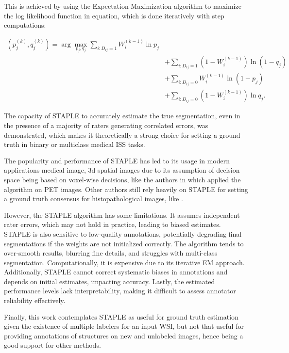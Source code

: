 This is achieved by using the Expectation-Maximization algorithm to
maximize the log likelihood function in equation, which is done iteratively
with step computations:

\begin{equation}
  \begin{split}
    (p_j^{(k)}, q_j^{(k)}) = \arg\max_{p_j, q_j} \sum_{i:D_{ij}=1}
    W_i^{(k-1)} \ln p_j \\
    &+ \sum_{i:D_{ij}=1} \left(1 - W_i^{(k-1)}\right) \ln (1 - q_j) \\
    &+ \sum_{i:D_{ij}=0} W_i^{(k-1)} \ln (1 - p_j) \\
    &+ \sum_{i:D_{ij}=0} \left(1 - W_i^{(k-1)}\right) \ln q_j.
  \end{split}
\end{equation}

The capacity of STAPLE to accurately estimate the true segmentation,
even in the presence of a majority of raters generating correlated
errors, was demonstrated, which makes it theoretically a strong
choice for setting a ground-truth in binary or multiclass medical
\gls{ISS} tasks.

The popularity and performance of \gls{STAPLE} has led to its
usage in modern applications medical image, 3d spatial images due to
its assumption of decision space being based on voxel-wise decisions,
like the authors in \cite{GrefveEtAl2024} which applied the algorithm
on \gls{PET} images. Other authors still rely heavily on STAPLE for
setting a ground truth consensus for histopathological images, like
\cite{QiuEtAl2022}.

However, the \gls{STAPLE} algorithm has some limitations. It
assumes independent rater errors, which may not hold in practice,
leading to biased estimates. STAPLE is also sensitive to low-quality
annotations, potentially degrading final segmentations if the weights
are not initialized correctly. The algorithm tends to over-smooth
results, blurring fine details, and struggles with multi-class
segmentation. Computationally, it is expensive due to its iterative
EM approach. Additionally, STAPLE cannot correct systematic biases in
annotations and depends on initial estimates, impacting accuracy.
Lastly, the estimated performance levels lack interpretability,
making it difficult to assess annotator reliability effectively.

Finally, this work contemplates \gls{STAPLE} as useful for ground
truth estimation given the existence of multiple labelers for an
input \gls{WSI}, but not that useful for providing annotations of structures on
new and unlabeled images, hence being a good support for other methods.

